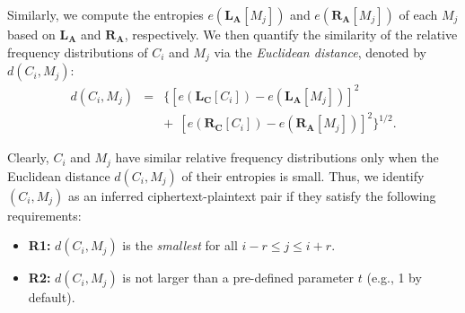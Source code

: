 \documentclass[bachelor]{thesis-uestc}
\begin{document}
Similarly, we compute the entropies $e(\mathbf{L_A}[M_j])$ and
$e(\mathbf{R_A}[M_j])$ of each $M_j$ based on $\mathbf{L_A}$ and
$\mathbf{R_A}$, respectively.  We then quantify the similarity of the relative
frequency distributions of $C_i$ and $M_j$ via the {\em Euclidean distance},
denoted by $d(C_i, M_j)$:  
\begin{eqnarray*}
	d(C_i, M_j) & = & 
	\big\{[e(\mathbf{L_C}[C_i]) - e(\mathbf{L_A}[M_j])]^2 \\
	& & + \ \ [e(\mathbf{R_C}[C_i]) - e(\mathbf{R_A}[M_j])]^2\big\}^{1/2}.
\end{eqnarray*}

Clearly, $C_i$ and $M_j$ have similar relative frequency distributions only
when the Euclidean distance $d(C_i, M_j)$ of their entropies is small.
Thus,  we identify $(C_i, M_j)$ as an inferred ciphertext-plaintext pair if
they satisfy the following requirements: 
%
\begin{itemize}[leftmargin=*]
\item {\bf R1:} $d(C_i, M_j)$ is the {\em smallest} for all $i-r \leq j \leq i+r$.
\item {\bf R2:} $d(C_i, M_j)$ is not larger than a pre-defined parameter $t$ (e.g., 1 by default).
\end{itemize}

\end{document}
